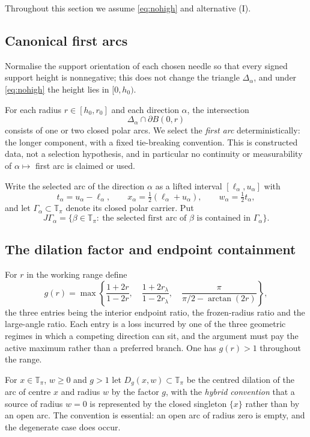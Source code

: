 \documentclass[11pt]{article}
\theoremstyle{plain}
\theoremstyle{definition}
\theoremstyle{remark}
\newcommand{\Tp}{\mathbb{T}_{\pi}}
\begin{document}
Throughout this section we assume \eqref{eq:nohigh} and alternative (I).

\subsection{Canonical first arcs}

Normalise the support orientation of each chosen needle so that every signed
support height is nonnegative; this does not change the triangle
$\Delta_{\alpha}$, and under \eqref{eq:nohigh} the height lies in $[0,h_{0})$.

For each radius $r\in[h_{0},r_{0}]$ and each direction $\alpha$, the intersection
\[
  \Delta_{\alpha}\cap \partial B(0,r)
\]
consists of one or two closed polar arcs. We select the \emph{first arc}
deterministically: the longer component, with a fixed tie-breaking convention.
This is constructed data, not a selection hypothesis, and in particular no
continuity or measurability of $\alpha\mapsto$ first arc is claimed or used.

Write the selected arc of the direction $\alpha$ as a lifted interval
$[\ell_{\alpha},u_{\alpha}]$ with
\[
  t_{\alpha}=u_{\alpha}-\ell_{\alpha},\qquad
  x_{\alpha}=\tfrac12(\ell_{\alpha}+u_{\alpha}),\qquad
  w_{\alpha}=\tfrac12 t_{\alpha},
\]
and let $\Gamma_{\alpha}\subset\Tp$ denote its closed polar carrier. Put
\[
  J\Gamma_{\alpha}
  =\{\beta\in\Tp:\ \text{the selected first arc of }\beta
     \text{ is contained in }\Gamma_{\alpha}\}.
\]

\subsection{The dilation factor and endpoint containment}

For $r$ in the working range define
\begin{equation}\label{eq:gdef}
  g(r)=\max\left\{
    \frac{1+2r}{1-2r},\quad
    \frac{1+2r_{\lambda}}{1-2r_{\lambda}},\quad
    \frac{\pi}{\pi/2-\arctan(2r)}
  \right\},
\end{equation}
the three entries being the interior endpoint ratio, the frozen-radius ratio and
the large-angle ratio. Each entry is a loss incurred by one of the three
geometric regimes in which a competing direction can sit, and the argument must
pay the active maximum rather than a preferred branch. One has $g(r)>1$
throughout the range.

For $x\in\Tp$, $w\ge0$ and $g>1$ let $D_{g}(x,w)\subset\Tp$ be the centred
dilation of the arc of centre $x$ and radius $w$ by the factor $g$, with the
\emph{hybrid convention} that a source of radius $w=0$ is represented by the
closed singleton $\{x\}$ rather than by an open arc. The convention is essential:
an open arc of radius zero is empty, and the degenerate case does occur.
\end{document}
